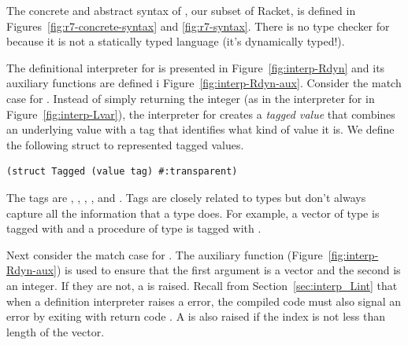 \documentclass[7x10]{TimesAPriori_MIT}%
\begin{document}
The concrete and abstract syntax of \LangDyn{}, our subset of Racket, is
defined in Figures~\ref{fig:r7-concrete-syntax} and
\ref{fig:r7-syntax}.
%
There is no type checker for \LangDyn{} because it is not a statically
typed language (it's dynamically typed!).

The definitional interpreter for \LangDyn{} is presented in
Figure~\ref{fig:interp-Rdyn} and its auxiliary functions are defined i
Figure~\ref{fig:interp-Rdyn-aux}. Consider the match case for
.  Instead of simply returning the integer  (as
in the interpreter for \LangVar{} in Figure~\ref{fig:interp-Lvar}), the
interpreter for \LangDyn{} creates a \emph{tagged value} that combines an underlying value with a tag that identifies
what kind of value it is. We define the following struct
to represented tagged values.
\begin{lstlisting}
(struct Tagged (value tag) #:transparent)
\end{lstlisting}
The tags are , , ,
, and . Tags are closely related to types
but don't always capture all the information that a type does. For
example, a vector of type  is tagged with
 and a procedure of type 
is tagged with .

Next consider the match case for .  The
 auxiliary function (Figure~\ref{fig:interp-Rdyn-aux})
is used to ensure that the first argument is a vector and the second
is an integer. If they are not, a  is raised.
Recall from Section~\ref{sec:interp_Lint} that when a definition
interpreter raises a  error, the compiled code
must also signal an error by exiting with return code .  A
 is also raised if the index is not less than
length of the vector.
\end{document}
